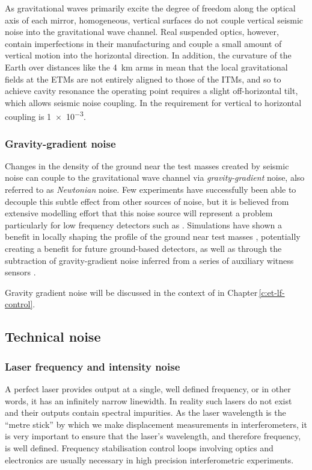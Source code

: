 As gravitational waves primarily excite the degree of freedom along the optical axis of each mirror, homogeneous, vertical surfaces do not couple vertical seismic noise into the gravitational wave channel. Real suspended optics, however, contain imperfections in their manufacturing and couple a small amount of vertical motion into the horizontal direction. In addition, the curvature of the Earth over distances like the \SI{4}{\kilo\meter} arms in \ALIGO{} mean that the local gravitational fields at the \glspl{ETM} are not entirely aligned to those of the \glspl{ITM}, and so to achieve cavity resonance the operating point requires a slight off-horizontal tilt, which allows seismic noise coupling. In \ALIGO{} the requirement for vertical to horizontal coupling is \num{1e-3}.

\subsubsection{\label{sec:gravity-gradient-noise}Gravity-gradient noise}
Changes in the density of the ground near the test masses created by seismic noise can couple to the gravitational wave channel via \emph{gravity-gradient} noise, also referred to as \emph{Newtonian} noise. Few experiments have successfully been able to decouple this subtle effect from other sources of noise, but it is believed from extensive modelling effort that this noise source will represent a problem particularly for low frequency detectors such as \ETLF{} \cite{ET2011, Hild2011}. Simulations have shown a benefit in locally shaping the profile of the ground near test masses \cite{Harms2014}, potentially creating a benefit for future ground-based detectors, as well as through the subtraction of gravity-gradient noise inferred from a series of auxiliary witness sensors \cite{Harms2015}.

Gravity gradient noise will be discussed in the context of \ETLF{} in Chapter\,\ref{c:et-lf-control}.

\subsection{Technical noise}

\subsubsection{\label{sec:laser-noise}Laser frequency and intensity noise}
A perfect laser provides output at a single, well defined frequency, or in other words, it has an infinitely narrow linewidth. In reality such lasers do not exist and their outputs contain spectral impurities. As the laser wavelength is the ``metre stick'' by which we make displacement measurements in interferometers, it is very important to ensure that the laser's wavelength, and therefore frequency, is well defined. Frequency stabilisation control loops involving optics and electronics are usually necessary in high precision interferometric experiments.

